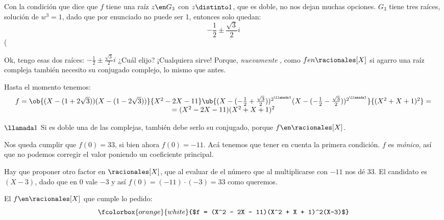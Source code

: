 \bigskip

Con la condición que dice que $f$ tiene una raíz $z \en G_3$ con $z \distinto 1$,
que es doble, no nos dejan muchas opciones. $G_3$ tiene tres raíces, solución
de $w^3 = 1$, dado que por enunciado no puede ser 1, entonces solo quedan:
$$
  -\frac{1}{2} \pm \frac{\sqrt{3}}{2}i
$$
(

\bigskip

Ok, tengo esas dos raíces: $-\frac{1}{2} \pm \frac{\sqrt{3}}{2}i$ ¿Cuál elijo? ¡Cualquiera
sirve! Porque, \textit{nuevamente {\tiny {}}}, como $f en \racionales[X]$ si agarro una raíz compleja
también necesito su conjugado complejo, lo mismo que antes.\par

Hasta el momento tenemos:
$$
  \begin{array}{c}
    f =
    \ob{(X - (1+2\sqrt{3})) (X - (1-2\sqrt{3}))}{X^2 - 2X - 11}
    \ub{(X - (-\frac{1}{2} + \frac{\sqrt{3}}{2}))^{2^{\llamada1}}
    (X - (-\frac{1}{2} - \frac{\sqrt{3}}{2}))^{2^{\llamada1}}}{(X^2 + X + 1)^2} = \\
    =(X^2 - 2X - 11)(X^2 + X + 1)^2
  \end{array}
$$

$\llamada1$ Si es doble una de las complejas, también debe serlo su conjugado, porque
$f\en \racionales[X]$.\bigskip

Nos queda cumplir que $f(0) = 33$, si bien ahora $f(0) = -11$. Acá tenemos que tener en cuenta
la primera condición. $f$ es \textit{mónico}, así que no podemos corregir el valor poniendo un coeficiente principal.

Hay que proponer otro factor en $\racionales[X]$, que al evaluar de el número que al multiplicarse con $-11$ nos dé
33. El candidato es $(X-3)$, dado que en 0 vale $-3$ y así $f(0) = (-11) \cdot (-3) = 33$ como queremos.\par

\bigskip

El $f \en\racionales[X]$ que cumple lo pedido:
$$
  \fcolorbox{orange}{white}{$f = (X^2 - 2X - 11)(X^2 + X + 1)^2(X-3)$}
$$

